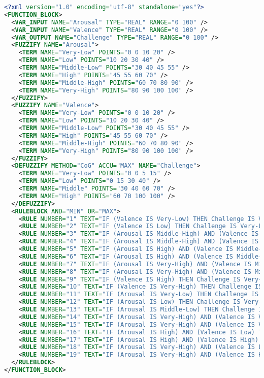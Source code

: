 \begin{lstlisting}[language=xml]
<?xml version="1.0" encoding="utf-8" standalone="yes"?>
<FUNCTION_BLOCK>
  <VAR_INPUT NAME="Arousal" TYPE="REAL" RANGE="0 100" />
  <VAR_INPUT NAME="Valence" TYPE="REAL" RANGE="0 100" />
  <VAR_OUTPUT NAME="Challenge" TYPE="REAL" RANGE="0 100" />
  <FUZZIFY NAME="Arousal">
    <TERM NAME="Very-Low" POINTS="0 0 10 20" />
    <TERM NAME="Low" POINTS="10 20 30 40" />
    <TERM NAME="Middle-Low" POINTS="30 40 45 55" />
    <TERM NAME="High" POINTS="45 55 60 70" />
    <TERM NAME="Middle-High" POINTS="60 70 80 90" />
    <TERM NAME="Very-High" POINTS="80 90 100 100" />
  </FUZZIFY>
  <FUZZIFY NAME="Valence">
    <TERM NAME="Very-Low" POINTS="0 0 10 20" />
    <TERM NAME="Low" POINTS="10 20 30 40" />
    <TERM NAME="Middle-Low" POINTS="30 40 45 55" />
    <TERM NAME="High" POINTS="45 55 60 70" />
    <TERM NAME="Middle-High" POINTS="60 70 80 90" />
    <TERM NAME="Very-High" POINTS="80 90 100 100" />
  </FUZZIFY>
  <DEFUZZIFY METHOD="CoG" ACCU="MAX" NAME="Challenge">
    <TERM NAME="Very-Low" POINTS="0 0 5 15" />
    <TERM NAME="Low" POINTS="0 15 30 40" />
    <TERM NAME="Middle" POINTS="30 40 60 70" />
    <TERM NAME="High" POINTS="60 70 100 100" />
  </DEFUZZIFY>
  <RULEBLOCK AND="MIN" OR="MAX">
    <RULE NUMBER="1" TEXT="IF (Valence IS Very-Low) THEN Challenge IS Very-Low" />
    <RULE NUMBER="2" TEXT="IF (Valence IS Low) THEN Challenge IS Very-Low" />
    <RULE NUMBER="3" TEXT="IF (Arousal IS Middle-High) AND (Valence IS Middle-Low) THEN Challenge IS Low" />
    <RULE NUMBER="4" TEXT="IF (Arousal IS Middle-High) AND (Valence IS Middle-High) THEN Challenge IS Low" />
    <RULE NUMBER="5" TEXT="IF (Arousal IS High) AND (Valence IS Middle-Low) THEN Challenge IS Middle" />
    <RULE NUMBER="6" TEXT="IF (Arousal IS High) AND (Valence IS Middle-High) THEN Challenge IS Middle" />
    <RULE NUMBER="7" TEXT="IF (Arousal IS Very-High) AND (Valence IS Middle-Low) THEN Challenge IS High" />
    <RULE NUMBER="8" TEXT="IF (Arousal IS Very-High) AND (Valence IS Middle-High) THEN Challenge IS High" />
    <RULE NUMBER="9" TEXT="IF (Valence IS High) THEN Challenge IS Very-Low" />
    <RULE NUMBER="10" TEXT="IF (Valence IS Very-High) THEN Challenge IS Very-Low" />
    <RULE NUMBER="11" TEXT="IF (Arousal IS Very-Low) THEN Challenge IS Very-Low" />
    <RULE NUMBER="12" TEXT="IF (Arousal IS Low) THEN Challenge IS Very-Low" />
    <RULE NUMBER="13" TEXT="IF (Arousal IS Middle-Low) THEN Challenge IS Very-Low" />
    <RULE NUMBER="14" TEXT="IF (Arousal IS Very-High) AND (Valence IS Very-Low) THEN Challenge IS Middle" />
    <RULE NUMBER="15" TEXT="IF (Arousal IS Very-High) AND (Valence IS Very-High) THEN Challenge IS Middle" />
    <RULE NUMBER="16" TEXT="IF (Arousal IS High) AND (Valence IS Low) THEN Challenge IS Low" />
    <RULE NUMBER="17" TEXT="IF (Arousal IS High) AND (Valence IS High) THEN Challenge IS Low" />
    <RULE NUMBER="18" TEXT="IF (Arousal IS Very-High) AND (Valence IS Low) THEN Challenge IS High" />
    <RULE NUMBER="19" TEXT="IF (Arousal IS Very-High) AND (Valence IS High) THEN Challenge IS High" />
  </RULEBLOCK>
</FUNCTION_BLOCK>
\end{lstlisting}
